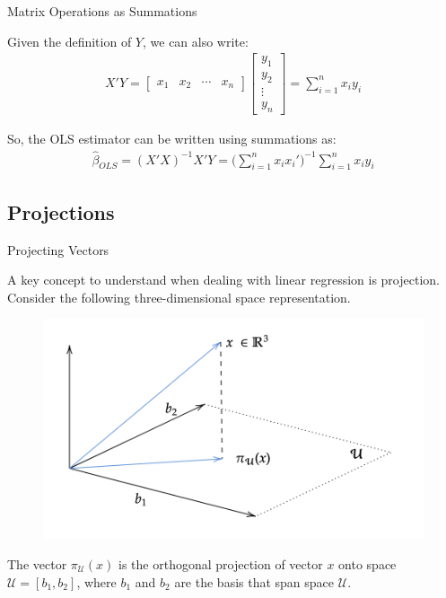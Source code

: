 \begin{frame}{Matrix Operations as Summations}

    Given the definition of $Y$, we can also write:
    \begin{align*}
        X' Y = \begin{bmatrix} 
                x_1 & x_2 & \cdots & x_n
                \end{bmatrix}
                \begin{bmatrix} 
                y_1 \\ y_2 \\ \vdots \\ y_n
                \end{bmatrix} = \sum_{i=1}^n x_i y_i
    \end{align*}
    
    So, the OLS estimator can be written using summations as:
    \begin{align*}
        \hat{\beta}_{OLS} = (X' X)^{-1} X' Y = \Biggr( \sum_{i=1}^n x_i x_i' \Biggr)^{-1} \sum_{i=1}^n x_i y_i
    \end{align*}
    
\end{frame}


\subsection{Projections}

\begin{frame}{Projecting Vectors}

    A key concept to understand when dealing with linear regression is projection. Consider the following three-dimensional space representation.

    \begin{figure}[ht]
        \centering
        \includegraphics[width=0.5\linewidth]{./resources/projections.png}
    \end{figure}

    The vector $\pi_{\mathcal{U}}(x)$ is the orthogonal projection of vector $x$ onto space $\mathcal{U} = [ b_1, b_2 ]$, where $b_1$ and $b_2$ are the basis that span space $\mathcal{U}$.
    
\end{frame}

